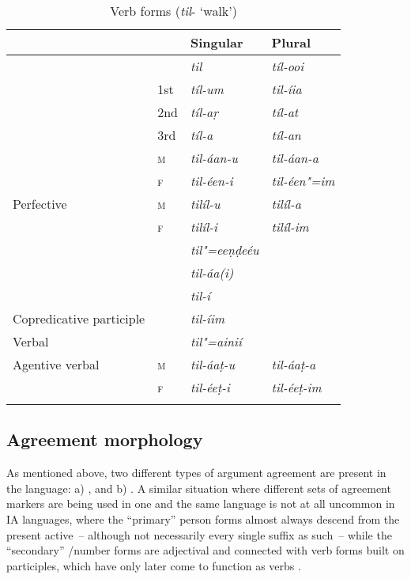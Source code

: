 \begin{table}[ht]
\caption{Verb forms (\textit{til}- `walk')}

\begin{tabularx}{\textwidth}{ Q l@{\hspace{20pt}} l@{\hspace{20pt}} l@{\hspace{20pt}} }
\lsptoprule
&
&
Singular &
Plural\\\midrule
{} &
&
\textit{til} &
\textit{tíl-ooi} \\
 &
1st &
\textit{tíl-um} &
\textit{til-íia} \\
&
2nd &
\textit{tíl-aṛ} &
\textit{tíl-at} \\
&
3rd &
\textit{tíl-a} &
\textit{tíl-an} \\
 &
\textsc{m} &
\textit{til-áan-u} &
\textit{til-áan-a} \\
&
\textsc{f} &
\textit{til-éen-i} &
\textit{til-éen"=im} \\
Perfective &
\textsc{m} &
\textit{tilíl-u} &
\textit{tilíl-a} \\
&
\textsc{f} &
\textit{tilíl-i} &
\textit{tilíl-im} \\
 &
&
\textit{til"=eeṇḍeéu} &
\\
 &
&
\textit{til-áa(i)} &
\\
 &
&
\textit{til-í} &
\\
Copredicative participle &
&
\textit{til-íim} &
\\
Verbal  &
&
\textit{til"=ainií} &
\\
Agentive verbal  &
\textsc{m} &
\textit{til-áaṭ-u} &
\textit{til-áaṭ-a} \\
&
\textsc{f} &
\textit{til-éeṭ-i} &
\textit{til-éeṭ-im} 
\\\lspbottomrule
\end{tabularx}
\label{tab:8-15}
\end{table}


\subsection{Agreement morphology}
\label{subsec:8-4-1}

As mentioned above, two different types of argument agreement are present in the language: a) , and b) . A similar situation where different sets of agreement markers are being used in one and the same language is not at all uncommon in IA languages, where the ``primary'' person forms almost always descend from the \iliOIA present active~-- although not necessarily every single suffix as such~-- while the ``secondary'' /number forms are adjectival and connected with verb forms built on participles, which have only later come to function as  verbs \citep[259--260]{masica1991}. 



